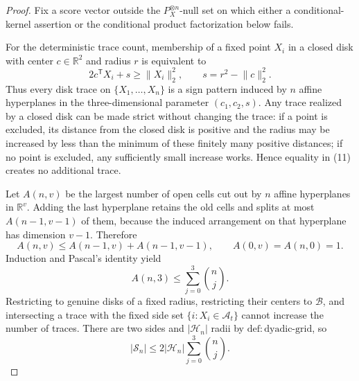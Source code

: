 \documentclass{article}
\begin{document}
\begin{proof}
Fix a score vector outside the \(P_X^{\otimes n}\)-null set on which either a conditional-kernel assertion or the conditional product factorization below fails.

For the deterministic trace count, membership of a fixed point \(X_i\) in a closed disk with center \(c\in\mathbb R^2\) and radius \(r\) is equivalent to
\[
 2c^{\mathsf T}X_i+s\ge \lVert X_i\rVert_2^2,
 \qquad s=r^2-\lVert c\rVert_2^2. \tag{11}
\]
Thus every disk trace on \(\{X_1,\ldots,X_n\}\) is a sign pattern induced by \(n\) affine hyperplanes in the three-dimensional parameter \((c_1,c_2,s)\). Any trace realized by a closed disk can be made strict without changing the trace: if a point is excluded, its distance from the closed disk is positive and the radius may be increased by less than the minimum of these finitely many positive distances; if no point is excluded, any sufficiently small increase works. Hence equality in (11) creates no additional trace.

Let \(A(n,v)\) be the largest number of open cells cut out by \(n\) affine hyperplanes in \(\mathbb R^v\). Adding the last hyperplane retains the old cells and splits at most \(A(n-1,v-1)\) of them, because the induced arrangement on that hyperplane has dimension \(v-1\). Therefore
\[
 A(n,v)\le A(n-1,v)+A(n-1,v-1),
 \qquad A(0,v)=A(n,0)=1. \tag{12}
\]
Induction and Pascal's identity yield
\[
 A(n,3)\le\sum_{j=0}^3\binom nj. \tag{13}
\]
Restricting to genuine disks of a fixed radius, restricting their centers to \(\mathcal B\), and intersecting a trace with the fixed side set \(\{i:X_i\in\mathcal A_t\}\) cannot increase the number of traces. There are two sides and \(|\mathcal H_n|\) radii by \(\mathrm{def:dyadic\text{-}grid}\), so
\[
 |\mathscr S_n|\le2|\mathcal H_n|\sum_{j=0}^3\binom nj. \tag{14}
\]


\end{proof}
\end{document}
